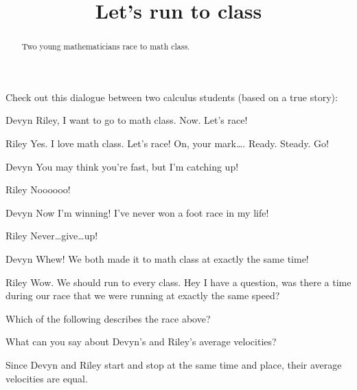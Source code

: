 \documentclass{ximera}
\title[Break-Ground:]{Let's run to class}
\begin{document}
\begin{abstract}
Two young mathematicians race to math class.
\end{abstract}
\maketitle

Check out this dialogue between two calculus students (based on a true
story):


\begin{dialogue}
\item[Devyn] Riley, I want to go to math class. Now. Let's race!
\item[Riley] Yes. I love math class. Let's race! On, your
  mark\dots. Ready. Steady. Go!
\item[Devyn] You may think you're fast, but I'm catching up!
\item[Riley] Noooooo!
\item[Devyn] Now I'm winning! I've never won a foot race in my life!
\item[Riley] Never\dots give\dots up!
\item[Devyn] Whew! We both made it to math class at exactly the same
  time!
\item[Riley] Wow. We should run to every class. Hey I have a question,
  was there a time during our race that we were running at exactly the
  same speed?
\end{dialogue}

\begin{problem}
  Which of the following describes the race above?
  \begin{multipleChoice}
  \end{multipleChoice}
\end{problem}

\begin{problem}
  What can you say about Devyn's and Riley's average velocities?
  \begin{multipleChoice}
  \begin{feedback}
    Since Devyn and Riley start and stop at the same time and place,
    their average velocities are equal.
  \end{feedback}
  \end{multipleChoice}
\end{problem}
\end{document}
